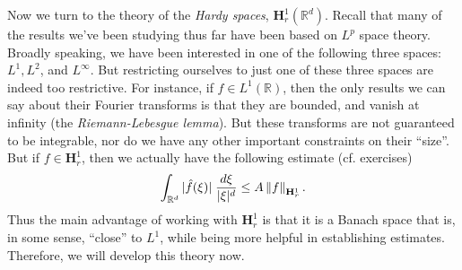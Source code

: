 \documentclass{article}
\begin{document}
Now we turn to the theory of the \textit{Hardy spaces}, $\mathbf{H}^{1}_{r}(\mathbb{R}^{d})$. Recall that many of the results we've been studying thus far have been based on $L^{p}$ space theory. Broadly speaking, we have been interested in one of the following three spaces: $L^{1}, L^{2}$, and $L^{\infty}$. But restricting ourselves to just one of these three spaces are indeed too restrictive. For instance, if $f \in L^{1}(\mathbb{R})$, then the only results we can say about their Fourier transforms is that they are bounded, and vanish at infinity (the \textit{Riemann-Lebesgue lemma}). But these transforms are not guaranteed to be integrable, nor do we have any other important constraints on their ``size''. But if $f \in \mathbf{H}^{1}_{r}$, then we actually have the following estimate (cf. exercises)
\begin{equation*}
	\int_{\mathbb{R}^{d}}|\hat{f}(\xi)|\;\frac{d\xi}{|\xi|^{d}} \leq A \left\Vert f \right\Vert_{\mathbf{H}^{1}_{r}}. 
\end{equation*} 
Thus the main advantage of working with $\mathbf{H}^{1}_{r}$ is that it is a Banach space that is, in some sense, ``close'' to $L^{1}$, while being more helpful in establishing estimates. Therefore, we will develop this theory now. 
\end{document}
